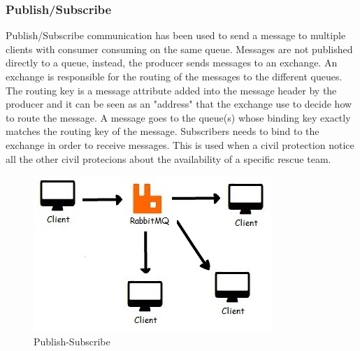 \documentclass[a4paper,12pt]{report}
\begin{document}
\subsubsection{Publish/Subscribe}
Publish/Subscribe communication has been used to send a message to multiple clients with consumer consuming on the same queue. 
Messages are not published directly to a queue, instead, the producer sends messages to an exchange.
An exchange is responsible for the routing of the messages to the different queues. 
The routing key is a message attribute added into the message header by the producer and it can be seen as an "address" that the exchange use to decide how to route the message. 
A message goes to the queue(s) whose binding key exactly matches the routing key of the message.
Subscribers needs to bind to the exchange in order to receive messages.
This is used when a civil protection notice all the other civil protecions about the availability of a specific rescue team.

\begin{figure}[ht]
\centering
\includegraphics{figures/ps.jpg}
\caption{Publish-Subscribe}
\label{fig:PS}
\end{figure}




\end{document}

